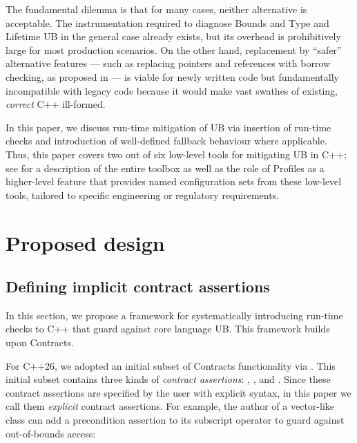 The fundamental dilemma is that for many cases, neither alternative is acceptable. The instrumentation required to diagnose Bounds and Type and Lifetime UB in the general case already exists, but its overhead is prohibitively large for most production scenarios. On the other hand, replacement by ``safer'' alternative features --- such as replacing pointers and references with borrow checking, as proposed in \cite{P3390R0} --- is viable for newly written code but fundamentally incompatible with legacy code because it would make vast swathes of existing, \emph{correct} C++ ill-formed.

In this paper, we discuss run-time mitigation of UB via insertion of run-time checks and introduction of well-defined fallback behaviour where applicable. Thus, this paper covers two out of six low-level tools for mitigating UB in C++; see \cite{P3756R0} %
for a description of the entire toolbox as well as the role of Profiles as a higher-level feature that provides named configuration sets from these low-level tools, tailored to specific engineering or regulatory requirements.


\section{Proposed design}
\label{design}

\subsection{Defining implicit contract assertions}
\label{defineicas}

In this section, we propose a framework for systematically introducing run-time checks to C++ that guard against core language UB. This framework builds upon Contracts.

For C++26, we adopted an initial subset of Contracts functionality via \cite{P2900R14}. This initial subset contains three kinds of \emph{contract assertions}: , , and . Since these contract assertions are specified by the user with explicit syntax, in this paper we call them \emph{explicit} contract assertions. For example, the author of a vector-like class can add a precondition assertion to its subscript operator to guard against out-of-bounds access:

